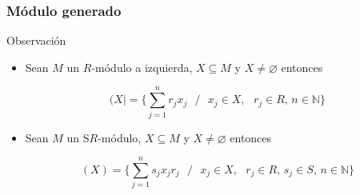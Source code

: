 \documentclass[notes=show]{beamer}%
\providecommand{\U}[1]{\protect\rule{.1in}{.1in}}
\newenvironment{Ob}{\begin{block}{Observación}}{\end{block}}
\begin{document}
\begin{frame}%


\bigskip%
\frametitle{Módulo generado}%


\begin{Ob}
\bigskip\ 

\begin{itemize}
\item Sean $M$ un $R$-módulo a izquierda, $X\subseteq M$ y $X\neq
\varnothing$ entonces%

\[
(X|=\{%
{\displaystyle\sum\limits_{j=1}^{n}}
r_{j}x_{j}\text{ }/\text{ }x_{j}\in X,\text{ }r_{j}\in R\text{, }n\in%
\mathbb{N}
\}
\]


\item Sean $M$ un S$R$-módulo, $X\subseteq M$ y $X\neq\varnothing$ entonces%

\[
(X)=\{%
{\displaystyle\sum\limits_{j=1}^{n}}
s_{j}x_{j}r_{j}\text{ }/\text{ }x_{j}\in X,\text{ }r_{j}\in R\text{, }s_{j}\in
S\text{, }n\in%
\mathbb{N}
\}
\]

\end{itemize}
\end{Ob}

%

\transboxout
\end{frame}%


\bigskip%
\end{document}
